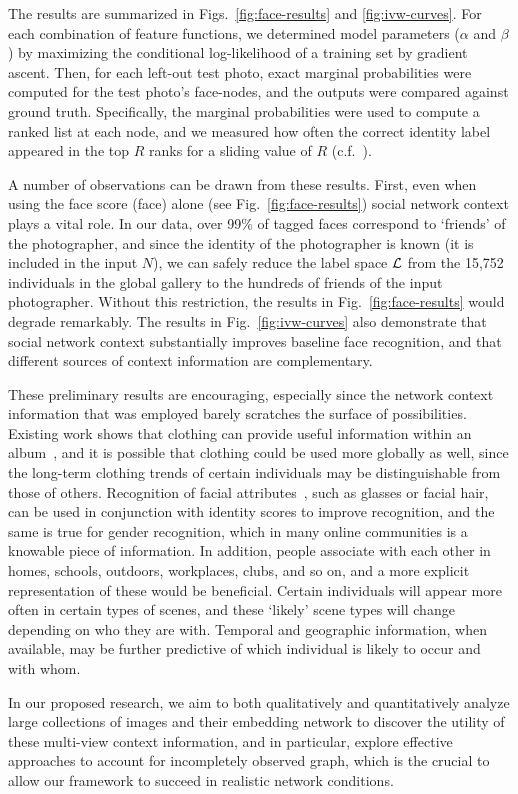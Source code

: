 The results are summarized in Figs.~\ref{fig:face-results} and \ref{fig:ivw-curves}. For each combination of feature functions, we determined model parameters ($\alpha$ and $\beta$) by maximizing the conditional log-likelihood of a training set by gradient ascent. Then, for each left-out test photo, exact marginal probabilities were computed for the test photo's face-nodes, and  the outputs were compared against ground truth. Specifically, the marginal probabilities were used to compute a ranked list at each node, and we measured how often the correct identity label appeared in the top $R$ ranks for a sliding value of $R$ (c.f.~\cite{frvt06}).

A number of observations can be drawn from these results. First, even when using the face score (\textsf{face}) alone (see Fig.~\ref{fig:face-results}) social network context plays a vital role. In our data, over 99\% of tagged faces correspond to `friends' of the photographer, and since the identity of the photographer is known (it is included in the input $N$), we can safely reduce the label space ${\cal L}$ from the 15,752 individuals in the global gallery to the hundreds of friends of the input photographer. Without this restriction, the results in Fig.~\ref{fig:face-results} would degrade remarkably. The results in Fig.~\ref{fig:ivw-curves} also demonstrate that social network context substantially improves baseline face recognition, and that different sources of context information are complementary.


These preliminary results are encouraging, especially since the network context information that was employed barely scratches the surface of possibilities. Existing work shows that clothing can provide useful information within an album~\cite{anguelov2007cir, zhang2003aah,  song2006cah, sivic2006fpr}, and it is possible that clothing could be used more globally as well, since the long-term clothing trends of certain individuals may be distinguishable from those of others. Recognition of facial attributes~\cite{LNCS53050340}, such as glasses or facial hair, can be used in conjunction with identity scores to improve recognition, and the same is true for gender recognition, which in many online communities is a knowable piece of information. In addition, people associate with each other in homes, schools, outdoors, workplaces, clubs, and so on, and a more explicit representation of these would be beneficial. Certain individuals will appear more often in certain types of scenes, and these `likely' scene types will change depending on who they are with. Temporal and geographic information, when available, may be further predictive of which individual is likely to occur and with whom. 



In our proposed research, we aim to both qualitatively and quantitatively analyze large collections of images and their embedding network to discover the utility of these multi-view context information, and in particular, explore effective approaches to account for incompletely observed graph, which is the crucial to allow our framework to succeed in realistic network conditions.